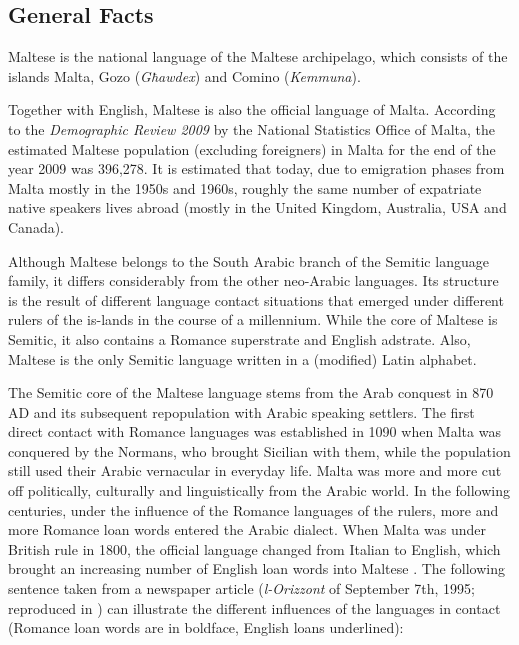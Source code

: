 \documentclass[]{../../metanetpaper}
\begin{document}
\clearpage

 \cite{Fabri1en}

\begin{multicols}{2}

\subsection{General Facts}

Maltese is the national language of the Maltese archipelago, which consists of the islands Malta, Gozo (\emph{Għawdex}) and Comino (\emph{Kemmuna}).

Together with English, Maltese is also the official language of Malta. According to the \emph{Demographic Review 2009} by the National Statistics Office of Malta, the estimated Maltese population (excluding foreigners) in Malta for the end of the year 2009 was 396,278. It is estimated that today, due to emigration phases from Malta mostly in the 1950s and 1960s, roughly the same number of expatriate native speakers lives abroad (mostly in the United Kingdom, Australia, USA and Canada).

Although Maltese belongs to the South Arabic branch of the Semitic language family, it differs considerably from the other neo-Arabic languages. Its structure is the result of different language contact situations that emerged under different rulers of the is-lands in the course of a millennium. While the core of Maltese is Semitic, it also contains a Romance superstrate and English adstrate. Also, Maltese is the only Semitic language written in a (modified) Latin alphabet.

The Semitic core of the Maltese language stems from the Arab conquest in 870 AD and its subsequent repopulation with Arabic speaking settlers. The first direct contact with Romance languages was established in 1090 when Malta was conquered by the Normans, who brought Sicilian with them, while the population still used their Arabic vernacular in everyday life. Malta was more and more cut off politically, culturally and linguistically from the Arabic world. In the following centuries, under the influence of the Romance languages of the rulers, more and more Romance loan words entered the Arabic dialect. When Malta was under British rule in 1800, the official language changed from Italian to English, which brought an increasing number of English loan words into Maltese . The following sentence taken from a newspaper article (\emph{l-Orizzont} of September 7th, 1995; reproduced in \cite{Ambros:1998}) can illustrate the different influences of the languages in contact (Romance loan words are in boldface, English loans underlined):


\end{multicols}
\end{document}
